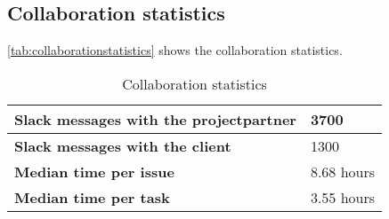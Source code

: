 \subsection{Collaboration statistics}
\autoref{tab:collaborationstatistics} shows the collaboration statistics.
\begin{table}[H]
  \centering
  \begin{tabular}{|m{60mm}|m{10mm}|}
	\hline
	\bf Slack messages with the projectpartner & 3700 \\
	\hline
	\bf Slack messages with the client & 1300 \\
	\hline
	\bf Median time per issue  & 8.68 hours \\
	\hline
	\bf Median time per task & 3.55 hours \\
    \hline
  \end{tabular} \\
  \caption{Collaboration statistics}
  \label{tab:collaborationstatistics}
\end{table}

